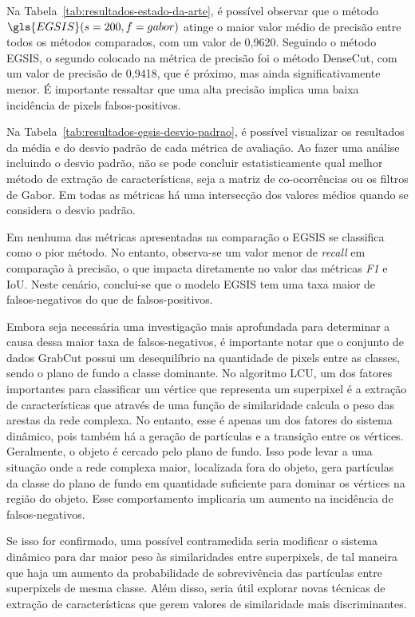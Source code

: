 Na Tabela~\ref{tab:resultados-estado-da-arte}, é possível
observar que o método $\gls{EGSIS}(s=200, f=gabor)$ atinge o maior
valor médio de precisão entre todos os métodos comparados, com um
valor de 0,9620. Seguindo o método EGSIS, o segundo colocado na
métrica de precisão foi o método DenseCut, com um valor de precisão de
0,9418, que é próximo, mas ainda significativamente menor. É
importante ressaltar que uma alta precisão implica uma baixa
incidência de pixels falsos-positivos.

Na Tabela~\ref{tab:resultados-egsis-desvio-padrao}, é possível
visualizar os resultados da média e do desvio padrão de cada métrica
de avaliação. Ao fazer uma análise incluindo o desvio padrão, não se
pode concluir estatisticamente qual melhor método de extração de
características, seja a matriz de co-ocorrências ou os filtros de
Gabor. Em todas as métricas há uma intersecção dos valores médios
quando se considera o desvio padrão.

Em nenhuma das métricas apresentadas na comparação o EGSIS se
classifica como o pior método. No entanto, observa-se um valor menor
de \textit{recall} em comparação à precisão, o que impacta diretamente
no valor das métricas \textit{F1} e IoU. Neste cenário, conclui-se que
o modelo EGSIS tem uma taxa maior de falsos-negativos do que de
falsos-positivos.

Embora seja necessária uma investigação mais aprofundada para
determinar a causa dessa maior taxa de falsos-negativos, é importante
notar que o conjunto de dados GrabCut possui um desequilíbrio na
quantidade de pixels entre as classes, sendo o plano de fundo a classe
dominante. No algoritmo \gls{LCU}, um dos fatores importantes para
classificar um vértice que representa um superpixel é a extração de
características que através de uma função de similaridade calcula o
peso das arestas da rede complexa. No entanto, esse é apenas um dos
fatores do sistema dinâmico, pois também há a geração de partículas e
a transição entre os vértices. Geralmente, o objeto é cercado pelo
plano de fundo. Isso pode levar a uma situação onde a rede complexa
maior, localizada fora do objeto, gera partículas da classe do plano
de fundo em quantidade suficiente para dominar os vértices na região
do objeto. Esse comportamento implicaria um aumento na incidência de
falsos-negativos.

Se isso for confirmado, uma possível contramedida seria modificar o
sistema dinâmico para dar maior peso às similaridades entre
superpixels, de tal maneira que haja um aumento da probabilidade
de sobrevivência das partículas entre superpixels de mesma
classe. Além disso, seria útil explorar novas técnicas de extração de
características que gerem valores de similaridade mais
discriminantes.
